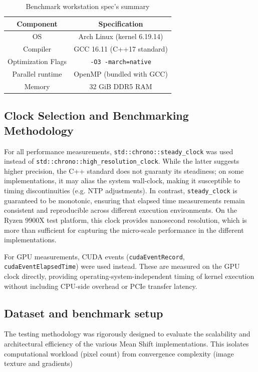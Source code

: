 \documentclass[10pt,twocolumn,letterpaper]{article}
\begin{document}
\begin{table}[]
    \centering
    \begin{tabular}{|c|c|}
    \hline
           Component &  Specification \\
           \hline\hline
         OS & Arch Linux (kernel 6.19.14) \\
         \hline
         Compiler & GCC 16.11 (C++17 standard) \\
         \hline
         Optimization Flags & \texttt{-O3 -march=native} \\
         \hline
         Parallel runtime & OpenMP (bundled with GCC) \\
         \hline
         Memory & 32 GiB DDR5 RAM \\
    \hline
    \end{tabular}
    \caption{Benchmark workstation spec's summary}
    \label{tab:components}
\end{table}

\subsection{Clock Selection and Benchmarking Methodology}
For all performance measurements, \texttt{std::chrono::steady\_clock} was used instead of \texttt{std::chrono::high\_resolution\_clock}. While the latter suggests higher precision, the C++ standard does not guaranty its steadiness; on some implementations, it may alias the system wall-clock, making it susceptible to timing discontinuities (e.g. NTP adjustments). In contrast, \texttt{steady\_clock} is guaranteed to be monotonic, ensuring that elapsed time measurements remain consistent and reproducible across different execution environments. On the Ryzen 9900X test platform, this clock provides nanosecond resolution, which is more than sufficient for capturing the micro-scale performance in the different  implementations.

For GPU measurements, CUDA events (\texttt{cudaEventRecord}, \texttt{cudaEventElapsedTime}) were used instead. These are measured on the GPU clock directly, providing operating-system-independent timing of kernel execution without including CPU-side overhead or PCIe transfer latency.

\subsection{Dataset and benchmark setup}
The testing methodology was rigorously designed  to evaluate the scalability and architectural efficiency of the various Mean Shift\cite{first_mean_shift} implementations. This isolates computational workload (pixel count) from convergence complexity (image texture and gradients)
\end{document}
